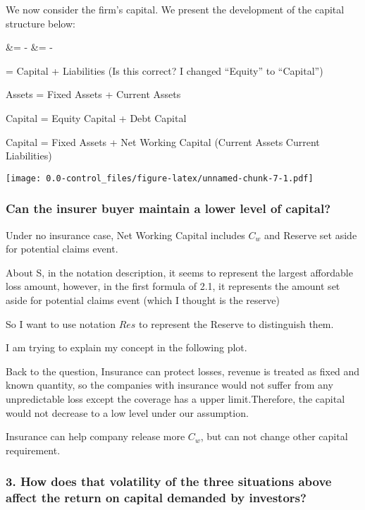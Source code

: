 \documentclass[
]{article}
\begin{document}
We now consider the firm's capital. We present the development of the
capital structure below:

\begin{eqnarray[*]}
 &=  - 
 &=  - 

\end{eqnarray[*]}

 = Capital + Liabilities (Is this correct? I changed
``Equity'' to ``Capital'')

Assets = Fixed Assets + Current Assets

Capital = Equity Capital + Debt Capital

Capital = Fixed Assets + Net Working Capital (Current Assets Current
Liabilities)

\texttt{[image: 0.0-control\_files/figure-latex/unnamed-chunk-7-1.pdf]}

\hypertarget{can-the-insurer-buyer-maintain-a-lower-level-of-capital}{%
\subsubsection{Can the insurer buyer maintain a lower level of
capital?}\label{can-the-insurer-buyer-maintain-a-lower-level-of-capital}}

Under no insurance case, Net Working Capital includes \(C_w\) and
Reserve set aside for potential claims event.

About S, in the notation description, it seems to represent the largest
affordable loss amount, however, in the first formula of 2.1, it
represents the amount set aside for potential claims event (which I
thought is the reserve)

So I want to use notation \(Res\) to represent the Reserve to
distinguish them.

I am trying to explain my concept in the following plot.

Back to the question, Insurance can protect losses, revenue is treated
as fixed and known quantity, so the companies with insurance would not
suffer from any unpredictable loss except the coverage has a upper
limit.Therefore, the capital would not decrease to a low level under our
assumption.

Insurance can help company release more \(C_w\), but can not change
other capital requirement.

\hypertarget{how-does-that-volatility-of-the-three-situations-above-affect-the-return-on-capital-demanded-by-investors}{%
\subsubsection{3. How does that volatility of the three situations above
affect the return on capital demanded by
investors?}\label{how-does-that-volatility-of-the-three-situations-above-affect-the-return-on-capital-demanded-by-investors}}
\end{document}
